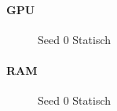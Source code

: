 \paragraph{GPU}
\begin{figure}[!htbp]
	\caption{Seed 0 Statisch}\label{fig:seed-0-static-gpu}
\end{figure}

\paragraph{RAM}
\begin{figure}[!htbp]
	\caption{Seed 0 Statisch}\label{fig:seed-0-static-mem}
\end{figure} 
